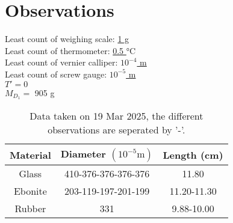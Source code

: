 \documentclass[%
 sor,
 jor,
 amsmath,amssymb,
 reprint,
]{revtex4-2}
\begin{document}
\section{Observations}
\noindent Least count of weighing scale:   \uline{1 g}  \\
Least count of thermometer:  \uline{ 0.5 $\si{\celsius}$ }\\
Least count of vernier calliper:  \uline{$10^{-4}$ m } \\
Least count of screw gauge:  \uline{$10^{-5}$ m } \\

\noindent $T'=0$\\
\noindent$M_{D_1} = $ 905 g



\begin{table}[h]
\centering
\begin{tabular}{|c|c|c|}
    \hline
    Material & Diameter $(10^{-5} \si{\meter})$  & Length (cm) \\
    \hline
    Glass	& 410-376-376-376-376 & 11.80\\
    Ebonite 	& 203-119-197-201-199 & 11.20-11.30\\
    Rubber 	& 331 & 9.88-10.00\\
    \hline
\end{tabular}
\caption{Data taken on 19 Mar 2025, the different observations are seperated by '-'.}

\end{table}
\end{document}
